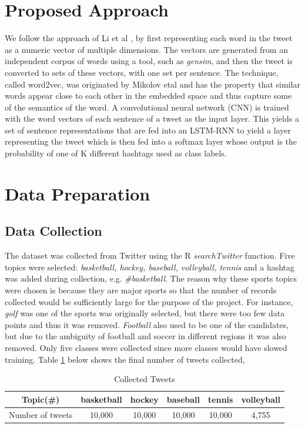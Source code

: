 \documentclass[journal, a4paper]{IEEEtran}
\begin{document}
\section{Proposed Approach}
We follow the approach of Li et al \cite{Li-lstm}, by first representing each word in the tweet as a numeric vector of multiple dimensions. The vectors are generated from an independent corpus of words using a tool, such as \textit{gensim}, and then the tweet is converted to sets of these vectors, with one set per sentence. The technique, called word2vec, was originated by Mikolov etal \cite{word2vec} and has the property that similar words appear close to each other in the embedded space and thus capture some of the semantics of the word.
A convolutional neural network (CNN) is trained with the word vectors of each sentence of a tweet as the input layer. This yields a set of sentence representations that are fed into an LSTM-RNN to yield a layer representing the tweet which is then fed into a softmax layer whose output is the probability of one of K different hashtags used as class labels.
\section{Data Preparation}
\subsection{Data Collection}
The dataset was collected from Twitter using the R \textit{searchTwitter} function. Five topics were selected: {\em basketball, hockey, baseball, volleyball, tennis} and a hashtag was added during collection, e.g. \textit{\#basketball}. The reason why these sports topics were chosen is because they are major sports so that the number of records collected would be sufficiently large for the purpose of the project. For instance, \textit{golf} was one of the sports was originally selected, but there were too few data points and thus it was removed. \textit{Football} also used to be one of the candidates, but due to the ambiguity of football and soccer in different regions it was also removed. Only five classes were collected since more classes would have slowed training. Table \ref{Tab:1} below shows the final number of tweets collected,
\begin{table}[ht]
	\begin{center}
		\begin{tabular}{|c|c|c|c|c|c|}
			\hline\hline
			Topic(\#) & basketball & hockey & baseball &tennis &volleyball\\
			\hline
			Number of tweets & 10,000 & 10,000 & 10,000 & 10,000 & 4,755\\
			\hline
		\end{tabular}
	\end{center}
	\caption{Collected Tweets}\label{Tab:1}
\end{table}
\end{document}
